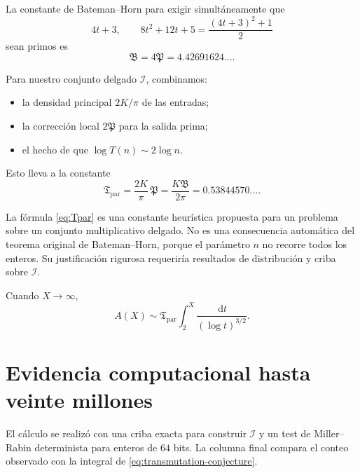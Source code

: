\documentclass[11pt,a4paper,openany]{report}
\newcommand{\Iset}{\mathcal{I}}
\newcommand{\dd}{\,\mathrm{d}}
\begin{document}
La constante de Bateman--Horn para exigir simultáneamente que
\[
 4t+3,
 \qquad
 8t^2+12t+5=\frac{(4t+3)^2+1}{2}
\]
sean primos es
\begin{equation}
 \mathfrak B=4\mathfrak P=4.42691624\ldots.
 \label{eq:B-pair}
\end{equation}

Para nuestro conjunto delgado \(\Iset\), combinamos:
\begin{itemize}
\item la densidad principal \(2K/\pi\) de las entradas;
\item la corrección local \(2\mathfrak P\) para la salida prima;
\item el hecho de que \(\log T(n)\sim2\log n\).
\end{itemize}
Esto lleva a la constante
\begin{equation}
 \boxed{
 \mathfrak T_{\mathrm{par}}
 =\frac{2K}{\pi}\,\mathfrak P
 =\frac{K\mathfrak B}{2\pi}
 =0.53844570\ldots.}
 \label{eq:Tpar}
\end{equation}

\begin{warningbox}
La fórmula \eqref{eq:Tpar} es una constante heurística propuesta para un problema sobre un conjunto multiplicativo delgado. No es una consecuencia automática del teorema original de Bateman--Horn, porque el parámetro \(n\) no recorre todos los enteros. Su justificación rigurosa requeriría resultados de distribución y criba sobre \(\Iset\).
\end{warningbox}

\begin{conjecture}
Cuando \(X\to\infty\),
\begin{equation}
 \boxed{
 A(X)\sim\mathfrak T_{\mathrm{par}}
 \int_2^X\frac{\dd t}{(\log t)^{3/2}}.}
 \label{eq:transmutation-conjecture}
\end{equation}
\end{conjecture}

\section{Evidencia computacional hasta veinte millones}

El cálculo se realizó con una criba exacta para construir \(\Iset\) y un test de Miller--Rabin determinista para enteros de \(64\) bits. La columna final compara el conteo observado con la integral de \eqref{eq:transmutation-conjecture}.
\end{document}

